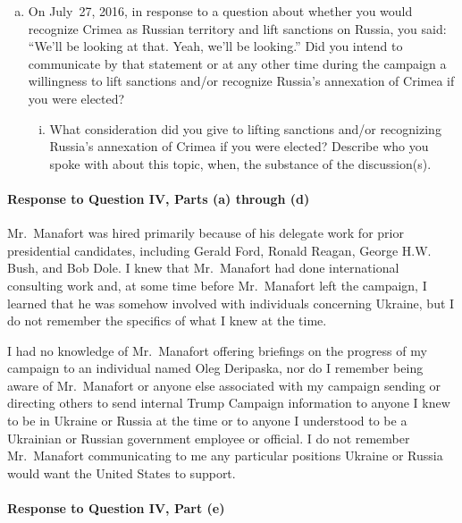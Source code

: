 \begin{enumerate}[a.]
\item On July~27, 2016, in response to a question about whether you would recognize Crimea as Russian territory and lift sanctions on Russia, you said: ``We'll be looking at that. Yeah, we'll be looking.''
Did you intend to communicate by that statement or at any other time during the campaign a willingness to lift sanctions and/or recognize Russia's annexation of Crimea if you were elected?

\begin{enumerate}[i.]

\item What consideration did you give to lifting sanctions and/or recognizing Russia's annexation of Crimea if you were elected?
Describe who you spoke with about this topic, when, the substance of the discussion(s).

\end{enumerate}

\end{enumerate}

\paragraph*{Response to Question IV, Parts (a) through (d)}

Mr.~Manafort was hired primarily because of his delegate work for prior presidential candidates, including Gerald Ford, Ronald Reagan, George H.W. Bush, and Bob Dole.
I knew that Mr.~Manafort had done international consulting work and, at some time before Mr.~Manafort left the campaign, I learned that he was somehow involved with individuals concerning Ukraine, but I do not remember the specifics of what I knew at the time.

I had no knowledge of Mr.~Manafort offering briefings on the progress of my campaign to an individual named Oleg Deripaska, nor do I remember being aware of Mr.~Manafort or anyone else associated with my campaign sending or directing others to send internal Trump Campaign information to anyone I knew to be in Ukraine or Russia at the time or to anyone I understood to be a Ukrainian or Russian government employee or official.
I do not remember Mr.~Manafort communicating to me any particular positions Ukraine or Russia would want the United States to support.

\paragraph*{Response to Question IV, Part (e)}


